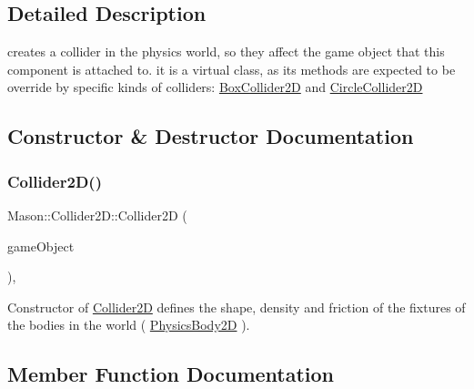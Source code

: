 \subsection{Detailed Description}
creates a collider in the physics world, so they affect the game object that this component is attached to. it is a virtual class, as its methods are expected to be override by specific kinds of colliders\+: \hyperlink{class_mason_1_1_box_collider2_d}{Box\+Collider2D} and \hyperlink{class_mason_1_1_circle_collider2_d}{Circle\+Collider2D} 

\subsection{Constructor \& Destructor Documentation}
\hypertarget{class_mason_1_1_collider2_d_a6873ad74052b0edb69dc61fcadace96b}{}\label{class_mason_1_1_collider2_d_a6873ad74052b0edb69dc61fcadace96b} 
\subsubsection{\texorpdfstring{Collider2\+D()}{Collider2D()}}
{\footnotesize\ttfamily Mason\+::\+Collider2\+D\+::\+Collider2D (\begin{DoxyParamCaption}\item[{std\+::shared\+\_\+ptr$<$ \hyperlink{class_mason_1_1_game_object}{Game\+Object} $>$}]{game\+Object }\end{DoxyParamCaption})\hspace{0.3cm}{\ttfamily [inline]}, {\ttfamily [protected]}}



Constructor of \hyperlink{class_mason_1_1_collider2_d}{Collider2D} defines the shape, density and friction of the fixtures of the bodies in the world ( \hyperlink{class_mason_1_1_physics_body2_d}{Physics\+Body2D} ). 



\subsection{Member Function Documentation}
\hypertarget{class_mason_1_1_collider2_d_aeb03667bfd9e1006fd9076199af786e4}{}\label{class_mason_1_1_collider2_d_aeb03667bfd9e1006fd9076199af786e4} 
